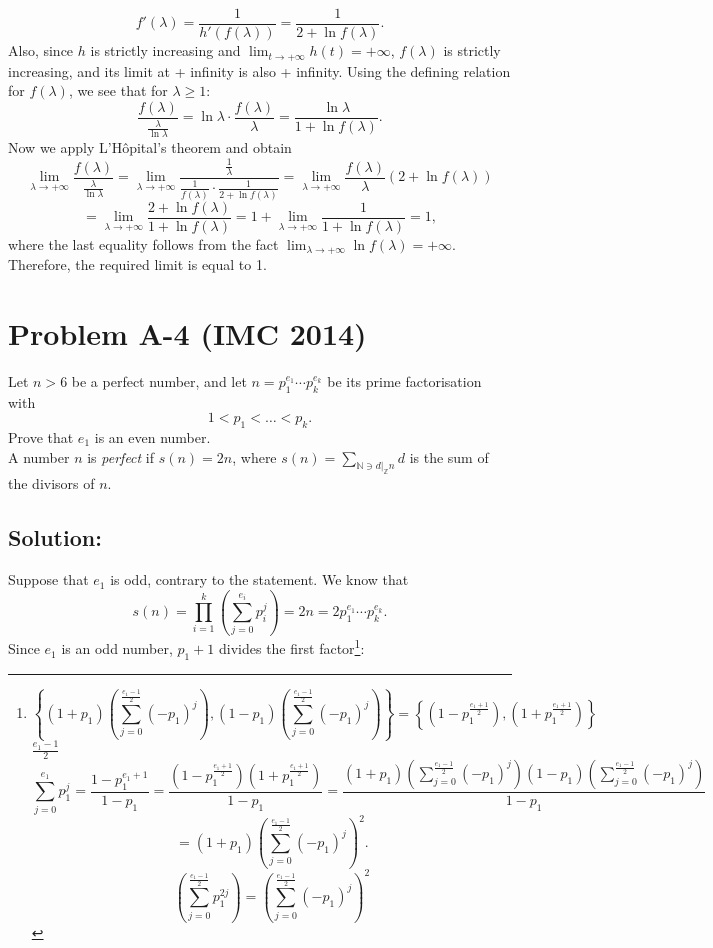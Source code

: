 \documentclass[11pt, a4paper, oneside]{article}
\newcommand{\problem}[1][]{\section{#1} \hfill \par}
\newcommand{\solution}[1][]{\subsection*{#1}\hfill \par}
\theoremstyle{remark}
\theoremstyle{lemma}
\begin{document}
\[
f'(\lambda) = \frac{1}{h'(f(\lambda))} = \frac{1}{2 + \ln f(\lambda)}.
\]
Also, since \( h \) is strictly increasing and \(\lim_{t \to +\infty} h(t) = +\infty\), \( f(\lambda) \) is strictly increasing, and its limit at + infinity is also + infinity. Using the defining relation for \( f(\lambda) \), we see that for $\lambda \geq 1$:
\[
\frac{f(\lambda)}{\frac{\lambda}{\ln \lambda}} = \ln \lambda \cdot \frac{f(\lambda)}{\lambda} = \frac{\ln \lambda}{1 + \ln f(\lambda)}.
\]
Now we apply L'Hôpital's theorem and obtain
\[
\lim_{\lambda \to +\infty} \frac{f(\lambda)}{\frac{\lambda}{\ln \lambda}} = \lim_{\lambda \to +\infty} \frac{\frac{1}{\lambda}}{\frac{1}{f(\lambda)} \cdot \frac{1}{2 + \ln f(\lambda)}} = \lim_{\lambda \to +\infty} \frac{f(\lambda)}{\lambda} (2 + \ln f(\lambda))\]
\[
= \lim_{\lambda \to +\infty} \frac{2 + \ln f(\lambda)}{1 + \ln f(\lambda)} = 1+\lim_{\lambda \to +\infty}\frac{1}{1+\ln f(\lambda)}=1,
\]
where the last equality follows from the fact $\lim_{\lambda\to +\infty}\ln f(\lambda)=+\infty$. Therefore, the required limit is equal to 1.
\newpage
\problem[Problem A-4 (IMC 2014)]
Let \(n > 6\) be a perfect number, and let \(n = p_{1}^{e_{1}} \cdots p_{k}^{e_{k}}\) be its prime factorisation with \[1 < p_{1} < \ldots < p_{k}.\] Prove that \(e_{1}\) is an even number.\\
A number \(n\) is \textit{perfect} if \(s(n) = 2n\), where \(s(n)=\sum_{\mathbb{N}\ni d|_{\mathbb{Z}}n}d\) is the sum of the divisors of \(n\).
\solution[Solution:]
Suppose that \(e_{1}\) is odd, contrary to the statement. We know that
\[
s(n) = \prod_{i=1}^{k} \left(\sum_{j=0}^{e_i}p_{i}^{j}\right) = 2n = 2p_{1}^{e_{1}} \cdots p_{k}^{e_{k}}.
\]
Since \(e_{1}\) is an odd number, \(p_{1} + 1\) divides the first factor\footnote{ $$\left\{(1+p_{1})\left(\sum_{j=0}^{\frac{e_{1}-1}{2}}(-p_{1})^j\right),(1-p_{1})\left(\sum_{j=0}^{\frac{e_{1}-1}{2}}(-p_{1})^j\right)\right\}=\left\{\left(1-p_{1}^{\frac{e_1+1}{2}}\right),\left(1+p_{1}^{\frac{e_1+1}{2}}\right)\right\}$$ $\frac{e_1-1}{2}$
\[
\sum_{j=0}^{e_1}p_{1}^{j}=\frac{1-p_{1}^{e_1+1}}{1-p_{1}}=\frac{\left(1-p_{1}^{\frac{e_1+1}{2}}\right)\left(1+p_{1}^{\frac{e_1+1}{2}}\right)}{1-p_{1}}
=\frac{(1+p_{1})\left(\sum_{j=0}^{\frac{e_{1}-1}{2}}(-p_{1})^j\right)(1-p_{1})\left(\sum_{j=0}^{\frac{e_{1}-1}{2}}(-p_{1})^j\right)}{1-p_{1}}
\]
\[
=(1+p_{1})\left(\sum_{j=0}^{\frac{e_{1}-1}{2}}(-p_{1})^j\right)^2.
\]
$$\left(\sum_{j=0}^{\frac{e_1-1}{2}}p_1^{2j}\right)=\left(\sum_{j=0}^{\frac{e_{1}-1}{2}}(-p_{1})^j\right)^2$$}:
\end{document}
